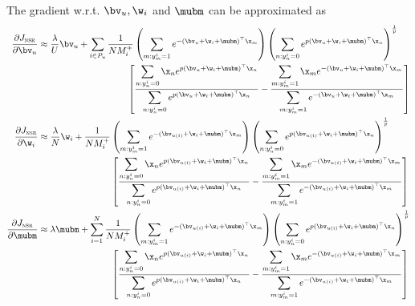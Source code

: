 The gradient w.r.t. $\bv_u, \w_i$ and $\mubm$ can be approximated as 
\begin{equation*}
\begin{aligned}
\frac{\partial J_\textsc{nsr}}{\partial \bv_u}
&\approx \frac{\lambda}{U} \bv_u
  + \sum_{i \in P_u} \frac{1}{N M_i^+} 
    \left( \sum_{m: y_m^i = 1} e^{-(\bv_u + \w_i + \mubm)^\top \x_m} \right)
    \left( \sum_{n: y_n^i = 0} e^{p (\bv_u + \w_i + \mubm)^\top \x_n} \right)^\frac{1}{p} \\
& \hspace{9.8em} \left[ 
    \frac{ \displaystyle \sum_{n: y_n^i = 0} \x_n e^{p (\bv_u + \w_i + \mubm)^\top \x_n} }
         { \displaystyle \sum_{n: y_n^i = 0} e^{p (\bv_u + \w_i + \mubm)^\top \x_n} }
    - \frac{ \displaystyle \sum_{m: y_m^i = 1} \x_m e^{-(\bv_u + \w_i + \mubm)^\top \x_m} }
           { \displaystyle \sum_{m: y_m^i = 1} e^{-(\bv_u + \w_i + \mubm)^\top \x_m} } \right] \\
%
\frac{\partial J_\textsc{nsr}}{\partial \w_i}
&\approx \frac{\lambda}{N} \w_i
  + \frac{1}{N M_i^+} 
    \left( \sum_{m: y_m^i = 1} e^{-(\bv_{u(i)} + \w_i + \mubm)^\top \x_m} \right)
    \left( \sum_{n: y_n^i = 0} e^{p (\bv_{u(i)} + \w_i + \mubm)^\top \x_n} \right)^\frac{1}{p} \\
& \hspace{8em} \left[ 
    \frac{ \displaystyle \sum_{n: y_n^i = 0} \x_n e^{p (\bv_{u(i)} + \w_i + \mubm)^\top \x_n} }
         { \displaystyle \sum_{n: y_n^i = 0} e^{p (\bv_{u(i)} + \w_i + \mubm)^\top \x_n} }
    - \frac{ \displaystyle \sum_{m: y_m^i = 1} \x_m e^{-(\bv_{u(i)} + \w_i + \mubm)^\top \x_m} }
           { \displaystyle \sum_{m: y_m^i = 1} e^{-(\bv_{u(i)} + \w_i + \mubm)^\top \x_m} } \right] \\
%
\frac{\partial J_\textsc{nsr}}{\partial \mubm}
&\approx \lambda \mubm
  + \sum_{i=1}^N \frac{1}{N M_i^+} 
    \left( \sum_{m: y_m^i = 1} e^{-(\bv_{u(i)} + \w_i + \mubm)^\top \x_m} \right)
    \left( \sum_{n: y_n^i = 0} e^{p (\bv_{u(i)} + \w_i + \mubm)^\top \x_n} \right)^\frac{1}{p} \\
& \hspace{8em} \left[ 
    \frac{ \displaystyle \sum_{n: y_n^i = 0} \x_n e^{p (\bv_{u(i)} + \w_i + \mubm)^\top \x_n} }
         { \displaystyle \sum_{n: y_n^i = 0} e^{p (\bv_{u(i)} + \w_i + \mubm)^\top \x_n} }
    - \frac{ \displaystyle \sum_{m: y_m^i = 1} \x_m e^{-(\bv_{u(i)} + \w_i + \mubm)^\top \x_m} }
           { \displaystyle \sum_{m: y_m^i = 1} e^{-(\bv_{u(i)} + \w_i + \mubm)^\top \x_m} } \right]
\end{aligned}
\end{equation*}


